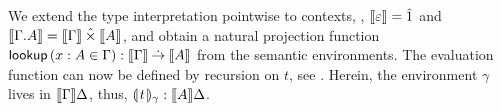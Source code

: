 \documentclass[sigconf,screen,fleqn]{acmart} %
\begin{document}
We extend the type interpretation pointwise to contexts, \ie,
$\den \cempty = \hatone$ and
$\den{\cext \Gamma A} = \den \Gamma \hattimes \den A$,
and obtain a natural projection function
$\tlookup\,(x : A \in \Gamma) : \den \Gamma \todot \den A$
from the semantic environments.
The evaluation function
can now be defined by recursion on $t$, see .
Herein, the environment $\gamma$ lives in $\den \Gamma \Delta$, thus, $\dent t \gamma : \den A \Delta$.
\end{document}
